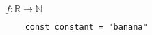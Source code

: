 \documentclass[fontsize=12pt]{article}
\title{}
\author{}
\date{\today}
\newcommand {\DS} [1] {${\displaystyle #1}$}
\newcommand{\R}{\mathbb{R}} \newcommand{\C}{\mathbb{C}} \newcommand{\Z}{\mathbb{Z}} \newcommand{\N}{\mathbb{N}} \renewcommand{\qedsymbol}{$\blacksquare$}
\begin{document}
\DS{f: \R \to \N}
\begin{verbatim}
    const constant = "banana"
\end{verbatim}
\end{document}
